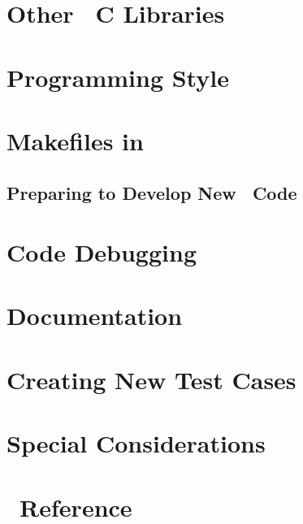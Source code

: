 \documentclass[12pt]{article}
\begin{document}
\section{Other \PSIthree\ C Libraries}\label{Other_Libs}


\section{Programming Style}\label{Style}


\section{Makefiles in \PSIthree}\label{Makefiles}


\subsection{Preparing to Develop New \PSIthree\ Code}\label{New_Code}


\section{Code Debugging}\label{Debugging}


\section{Documentation}\label{Documentation}


\section{Creating New Test Cases}\label{Testing}


\section{Special Considerations}\label{Special_Considerations}


\newpage
\appendix

%

\section{\PSIthree\ Reference}\label{PSI_Reference}

\end{document}
